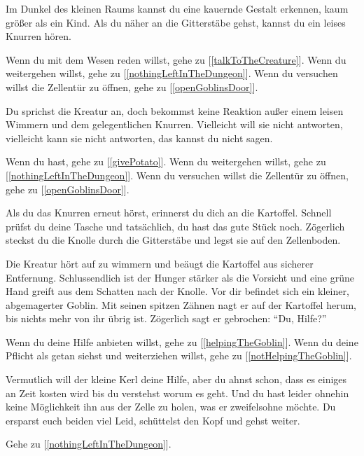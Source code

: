 Im Dunkel des kleinen Raums kannst du eine kauernde Gestalt erkennen, kaum größer als ein Kind.
Als du näher an die Gitterstäbe gehst, kannst du ein leises Knurren hören.

Wenn du mit dem Wesen reden willst, gehe zu [\ref{talkToTheCreature}].
Wenn du weitergehen willst, gehe zu [\ref{nothingLeftInTheDungeon}].
Wenn du versuchen willst die Zellentür zu öffnen, gehe zu [\ref{openGoblinsDoor}].


Du sprichst die Kreatur an, doch bekommst keine Reaktion außer einem leisen Wimmern und dem gelegentlichen Knurren. Vielleicht will sie nicht antworten, vielleicht kann sie nicht antworten, das kannst du nicht sagen.

Wenn du  hast, gehe zu [\ref{givePotato}].
Wenn du weitergehen willst, gehe zu [\ref{nothingLeftInTheDungeon}].
Wenn du versuchen willst die Zellentür zu öffnen, gehe zu [\ref{openGoblinsDoor}].


Als du das Knurren erneut hörst, erinnerst du dich an die Kartoffel. Schnell prüfst du deine Tasche und tatsächlich, du hast das gute Stück noch. Zögerlich steckst du die Knolle durch die Gitterstäbe und legst sie auf den Zellenboden.

Die Kreatur hört auf zu wimmern und beäugt die Kartoffel aus sicherer Entfernung. Schlussendlich ist der Hunger stärker als die Vorsicht und eine grüne Hand greift aus dem Schatten nach der Knolle. Vor dir befindet sich ein kleiner, abgemagerter Goblin. Mit seinen spitzen Zähnen nagt er auf der Kartoffel herum, bis nichts mehr von ihr übrig ist. Zögerlich sagt er gebrochen: ``Du, Hilfe?''

Wenn du deine Hilfe anbieten willst, gehe zu [\ref{helpingTheGoblin}].
Wenn du deine Pflicht als getan siehst und weiterziehen willst, gehe zu [\ref{notHelpingTheGoblin}].


Vermutlich will der kleine Kerl deine Hilfe, aber du ahnst schon, dass es einiges an Zeit kosten wird bis du verstehst worum es geht. Und du hast leider ohnehin keine Möglichkeit ihn aus der Zelle zu holen, was er zweifelsohne möchte. Du ersparst euch beiden viel Leid, schüttelst den Kopf und gehst weiter.

Gehe zu [\ref{nothingLeftInTheDungeon}].

